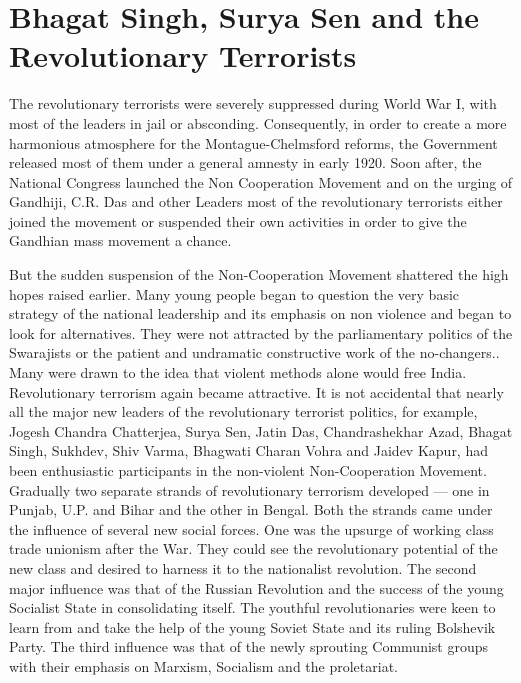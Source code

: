 \chapter[The Revolutionary Terrorist]{Bhagat Singh, Surya Sen and the Revolutionary Terrorists}



The revolutionary terrorists were severely suppressed during World War I, with most of the leaders in jail or absconding. Consequently, in order to create a more harmonious atmosphere for the Montague-Chelmsford reforms, the Government released most of them under a general amnesty in early 1920. Soon after, the National Congress launched the Non Cooperation Movement and on the urging of Gandhiji, C.R. Das and other Leaders most of the revolutionary terrorists either joined the movement or suspended their own activities in order to give the Gandhian mass movement a chance.

But the sudden suspension of the Non-Cooperation Movement shattered the high hopes raised earlier. Many young people began to question the very basic strategy of the national leadership and its emphasis on non violence and began to look for alternatives. They were not attracted by the parliamentary politics of the Swarajists or the patient and undramatic constructive work of the no-changers.. Many were drawn to the idea that violent methods alone would free India. Revolutionary terrorism again became attractive. It is not accidental that nearly all the major new leaders of the revolutionary terrorist politics, for example, Jogesh Chandra Chatterjea, Surya Sen, Jatin Das, Chandrashekhar Azad, Bhagat Singh, Sukhdev, Shiv Varma, Bhagwati Charan Vohra and Jaidev Kapur, had been enthusiastic participants in the non-violent Non-Cooperation Movement. Gradually two separate strands of revolutionary terrorism developed — one in Punjab, U.P. and Bihar and the other in Bengal. Both the strands came under the influence of several new social forces. One was the upsurge of working class trade unionism after the War. They could see the revolutionary potential of the new class and desired to harness it to the nationalist revolution. The second major influence was that of the Russian Revolution and the success of the young Socialist State in consolidating itself. The youthful revolutionaries were keen to learn from and take the help of the young Soviet State and its ruling Bolshevik Party. The third influence was that of the newly sprouting Communist groups with their emphasis on Marxism, Socialism and the proletariat.

